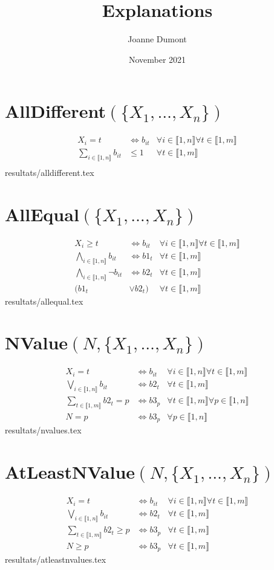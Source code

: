 \documentclass{article}
\title{Explanations}
\author{Joanne Dumont}
\date{November 2021}
\newcommand{\alldiff}{AllDifferent$(\{X_1,\ldots,X_n\})~$}
\newcommand{\alleq}{AllEqual$(\{X_1,\ldots,X_n\})~$}
\newcommand{\nvalue}{NValue$(N,\{X_1,\ldots,X_n\})~$}
\newcommand{\atlnvalue}{AtLeastNValue$(N,\{X_1,\ldots,X_n\})~$}
\newcommand{\I}{i\in\llbracket1,n\rrbracket}
\newcommand{\T}{t\in\llbracket1,m\rrbracket}
\newcommand{\PP}{p\in\llbracket1,n\rrbracket}
\newcommand{\fai}{\forall\I}
\newcommand{\fat}{\forall\T}
\newcommand{\fap}{\forall\PP}
\newcommand{\fit}{\fai\fat}
\begin{document}
\maketitle

\section{\texorpdfstring{\alldiff}{alldiff}}
\begin{align*}
    X_i = t &\iff b_{it}&\fai\fat\\
    \sum_{\I} b_{it}&\leq 1&\fat\\
\end{align*}
{resultats/alldifferent.tex}

\section{\texorpdfstring{\alleq}{alleq}}
\begin{align*}
    X_i\geq t & \iff b_{it}&\fit\\
    \bigwedge_{\I} b_{it} &\iff b1_t &\fat\\
    \bigwedge_{\I} \neg b_{it} &\iff b2_t &\fat\\
    (b1_t &\vee b2_t) &\fat
\end{align*}
{resultats/allequal.tex}

\section{\texorpdfstring{\nvalue}{nvalue}}
\begin{align*}
    X_i=t &\iff b_{it}&\fit\\
    \bigvee_{\I}b_{it}&\iff b2_t&\fat\\
    \sum_{\T}b2_{t} = p&\iff b3_{p}&\fat\fap\\
    N= p &\iff b3_p&\fap
\end{align*}
{resultats/nvalues.tex}

\section{\texorpdfstring{\atlnvalue}{atlnvalue}}
\begin{align*}
    X_i=t &\iff b_{it}&\fit\\
    \bigvee_{\I}b_{it}&\iff b2_t&\fat\\
    \sum_{\T}b2_{t} \geq p&\iff b3_{p}&\fat\\
    N\geq p &\iff b3_p&\fat
\end{align*}
{resultats/atleastnvalues.tex}
\end{document}
